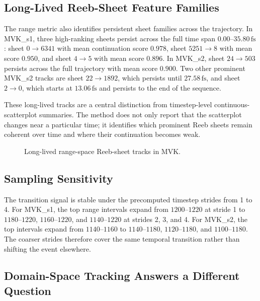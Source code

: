 \subsection{Long-Lived Reeb-Sheet Feature Families}

The range metric also identifies persistent sheet families across the
trajectory. In MVK\_s1, three high-ranking sheets persist across the full time
span \(0.00\)--\(35.80\,\mathrm{fs}\): sheet \(0\rightarrow6341\) with mean
continuation score \(0.978\), sheet \(5251\rightarrow8\) with mean score
\(0.950\), and sheet \(4\rightarrow5\) with mean score \(0.896\). In MVK\_s2,
sheet \(24\rightarrow503\) persists across the full trajectory with mean score
\(0.900\). Two other prominent MVK\_s2 tracks are sheet \(22\rightarrow1892\),
which persists until \(27.58\,\mathrm{fs}\), and sheet \(2\rightarrow0\), which
starts at \(13.06\,\mathrm{fs}\) and persists to the end of the sequence.

These long-lived tracks are a central distinction from timestep-level
continuous-scatterplot summaries. The method does not only report that the
scatterplot changes near a particular time; it identifies which prominent Reeb
sheets remain coherent over time and where their continuation becomes weak.

\begin{figure}[t]
  \centering
  \caption{Long-lived range-space Reeb-sheet tracks in MVK.}
  \label{fig:mvk-long-lived-tracks}
\end{figure}

\subsection{Sampling Sensitivity}

The transition signal is stable under the precomputed timestep strides from 1
to 4. For MVK\_s1, the top range intervals expand from \(1200\)--\(1220\) at
stride 1 to \(1180\)--\(1220\), \(1160\)--\(1220\), and \(1140\)--\(1220\) at
strides 2, 3, and 4. For MVK\_s2, the top intervals expand from
\(1140\)--\(1160\) to \(1140\)--\(1180\), \(1120\)--\(1180\), and
\(1100\)--\(1180\). The coarser strides therefore cover the same temporal
transition rather than shifting the event elsewhere.

\subsection{Domain-Space Tracking Answers a Different Question}

